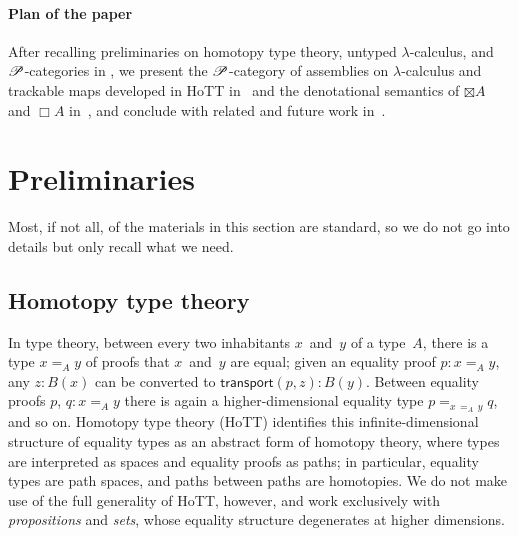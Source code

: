 \documentclass[a4paper,UKenglish,numberwithinsect,cleveref,thm-restate,draft]{lipics-v2021}
\numberwithin{equation}{section}
\theoremstyle{definition}
\theoremstyle{plain}
\begin{document}

\paragraph*{Plan of the paper}
After recalling preliminaries on homotopy type theory, untyped $\lambda$-calculus, and $\mathscr{P}$-categories in , we present the $\mathscr{P}$-category of assemblies on $\lambda$-calculus and trackable maps developed in HoTT in~ and the denotational semantics of $\boxtimes A$ and $\Box A$ in~, and conclude with related and future work in~.

\section{Preliminaries}\label{sec:preliminaries}

Most, if not all, of the materials in this section are standard, so we do not go into details but only recall what we need.

\subsection{Homotopy type theory}

In type theory, between every two inhabitants $x$~and~$y$ of a type~$A$, there is a type $x =_A y$ of proofs that $x$~and~$y$ are equal; given an equality proof $p : x =_A y$, any $z : B(x)$ can be converted to $\mathsf{transport}(p, z) : B(y)$.
Between equality proofs $p$, $q : x =_A y$ there is again a higher-dimensional equality type $p =_{x\,{=_A}\,y} q$, and so on.
Homotopy type theory (HoTT) identifies this infinite-dimensional structure of equality types as an abstract form of homotopy theory, where types are interpreted as spaces and equality proofs as paths; in particular, equality types are path spaces, and paths between paths are homotopies.
We do not make use of the full generality of HoTT, however, and work exclusively with \emph{propositions} and \emph{sets}, whose equality structure degenerates at higher dimensions.
\end{document}

